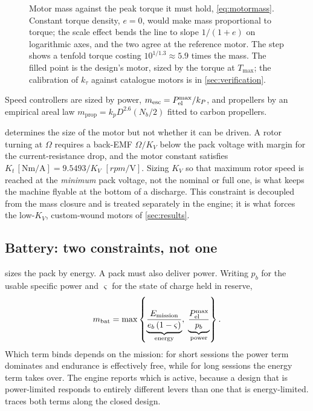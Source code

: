\begin{figure}[tbp]
\centering

\caption{Motor mass against the peak torque it must hold, \cref{eq:motormass}.
Constant torque density, $e=0$, would make mass proportional to torque; the
scale effect bends the line to slope $1/(1+e)$ on logarithmic axes, and the
two agree at the reference motor. The step shows a tenfold torque costing
$10^{1/1.3}\approx5.9$ times the mass. The filled point is the design's motor,
sized by the torque at $T_{\max}$; the calibration of $k_\tau$ against
catalogue motors is in \cref{sec:verification}.}
\label{fig:motor}
\end{figure}

Speed controllers are sized by power, $m_{\mathrm{esc}} = P_{\mathrm{el}}^{\max}/k_P$,
and propellers by an empirical areal law $m_{\mathrm{prop}} = k_p D^{2.6}
(N_b/2)$ fitted to carbon propellers.

\begin{remark}
 determines the size of the motor but not whether it can be
driven. A rotor turning at $\Omega$ requires a back-EMF $\Omega/K_V$ below the
pack voltage with margin for the current-resistance drop, and the motor
constant satisfies $K_t\,[\si{\newton\metre\per\ampere}] = 9.5493/K_V$
$[\si{rpm\per\volt}]$. Sizing $K_V$ so that maximum rotor speed is reached at
the \emph{minimum} pack voltage, not the nominal or full one, is what keeps the
machine flyable at the bottom of a discharge. This constraint is decoupled from
the mass closure and is treated separately in the engine; it is what forces the
low-$K_V$, custom-wound motors of \cref{sec:results}.
\end{remark}

\subsection{Battery: two constraints, not one}

 sizes the pack by energy. A pack must also deliver power.
Writing $p_b$ for the usable specific power and $\varsigma$ for the state of
charge held in reserve,
\begin{equation}
  m_{\mathrm{bat}} = \max\left\{
    \underbrace{\frac{E_{\mathrm{mission}}}{e_b\,(1-\varsigma)}}
      _{\text{energy}},\;
    \underbrace{\frac{P_{\mathrm{el}}^{\max}}{p_b}}_{\text{power}}
  \right\} .
  \label{eq:batmax}
\end{equation}
Which term binds depends on the mission: for short sessions the power term
dominates and endurance is effectively free, while for long sessions the energy
term takes over. The engine reports which is active, because a design that is
power-limited responds to entirely different levers than one that is
energy-limited.  traces both terms along the closed design.

